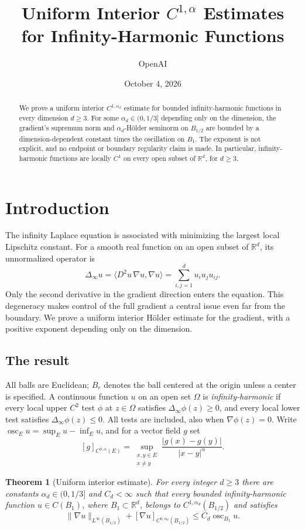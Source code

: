 \documentclass[11pt]{article}
\title{Uniform Interior $C^{1,\alpha}$ Estimates\\
for Infinity-Harmonic Functions}
\author{OpenAI}
\date{October 4, 2026}
\numberwithin{equation}{section}
\newtheorem{theorem}{Theorem}[section]
\theoremstyle{definition}
\theoremstyle{remark}
\newcommand{\R}{\mathbb{R}}
\newcommand{\Dinf}{\Delta_{\infty}}
\DeclareMathOperator{\osc}{osc}
\begin{document}
\maketitle

\begin{abstract}
We prove a uniform interior $C^{1,\alpha_d}$ estimate for bounded
infinity-harmonic functions in every dimension $d\ge3$. For some
$\alpha_d\in(0,1/3]$ depending only on the dimension, the gradient's
supremum norm and $\alpha_d$-H\"older seminorm on $B_{1/2}$ are bounded
by a dimension-dependent constant times the oscillation on $B_1$.
The exponent is not explicit, and no endpoint or boundary regularity
claim is made. In particular, infinity-harmonic functions are locally
$C^1$ on every open subset of $\mathbb{R}^d$, for $d\ge3$.
\end{abstract}


\section{Introduction}\label{sec:introduction}

The infinity Laplace equation is associated with minimizing the largest
local Lipschitz constant. For a smooth real function on an open subset of
$\R^d$, its unnormalized operator is
\[
 \Dinf u=\langle D^2u\,\nabla u,\nabla u\rangle
       =\sum_{i,j=1}^d u_i u_j u_{ij}.
\]
Only the second derivative in the gradient direction enters the equation.
This degeneracy makes control of the full gradient a central issue even
far from the boundary. We prove a uniform interior H\"older estimate for
the gradient, with a positive exponent depending only on the dimension.

\subsection{The result}
All balls are Euclidean; $B_r$ denotes the ball centered at the origin
unless a center is specified. A continuous function $u$ on an open set
$\Omega$ is \emph{infinity-harmonic} if every local upper $C^2$ test $\phi$
at $z\in\Omega$ satisfies $\Dinf\phi(z)\ge0$, and every local lower test
satisfies $\Dinf\phi(z)\le0$. All tests are included, also when
$\nabla\phi(z)=0$. Write $\osc_Eu=\sup_Eu-\inf_Eu$, and for a vector
field $g$ set
\[
 [g]_{C^{0,\alpha}(E)}
   =\sup_{\substack{x,y\in E\\x\ne y}}
       \frac{|g(x)-g(y)|}{|x-y|^\alpha}.
\]

\begin{theorem}[Uniform interior estimate]\label{thm:main}
For every integer $d\ge3$ there are constants $\alpha_d\in(0,1/3]$ and
$C_d<\infty$ such that every bounded infinity-harmonic function
$u\in C(B_1)$, where $B_1\subset\R^d$, belongs to
$C^{1,\alpha_d}(B_{1/2})$ and satisfies
\[
 \|\nabla u\|_{L^\infty(B_{1/2})}
       +[\nabla u]_{C^{0,\alpha_d}(B_{1/2})}
       \le C_d\osc_{B_1}u.
\]
\end{theorem}
\end{document}
